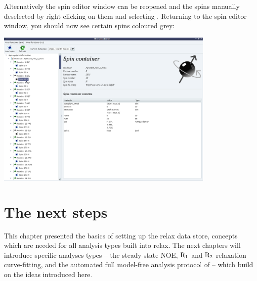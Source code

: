 Alternatively the spin editor window can be reopened and the spins manually deselected by right clicking on them and selecting .  Returning to the spin editor window, you should now see certain spins coloured grey:

\begin{minipage}[h]{\linewidth}
\centerline{\includegraphics[width=0.8\textwidth, bb=14 14 1415 1019]{graphics/screenshots/spin_viewer/deselect}}
\end{minipage}




\section{The next steps}

This chapter presented the basics of setting up the relax data store, concepts which are needed for all analysis types built into relax.  The next chapters will introduce specific analyses types -- the steady-state NOE, $\mathrm{R}_1$ and $\mathrm{R}_2$ relaxation curve-fitting, and the automated full model-free analysis protocol of \citet{dAuvergneGooley07,dAuvergneGooley08b} -- which build on the ideas introduced here.
